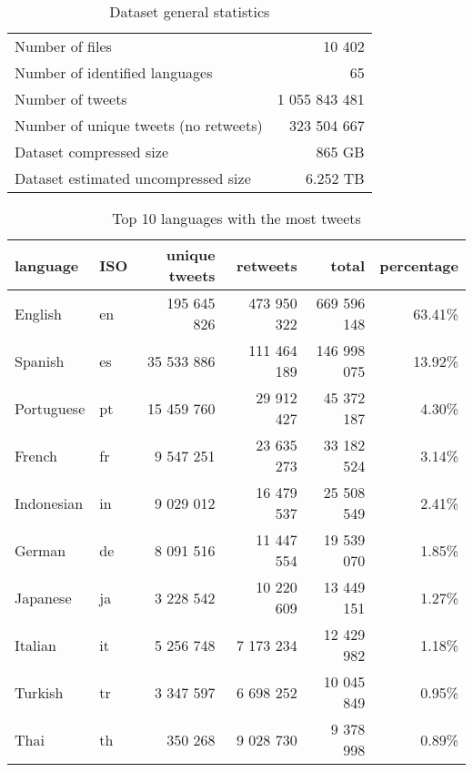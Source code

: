 \begin{table}[H]
    \centering
    \begin{tabularx}{\columnwidth}{@{}Xr@{}}
        Number of files & 10 402
        \\
        Number of identified languages & 65
        \\
        Number of tweets & 1 055 843 481
        \\
        Number of unique tweets (no retweets) & 323 504 667
        \\
        Dataset compressed size & 865 GB
        \\
        Dataset estimated uncompressed size & 6.252 TB
    \end{tabularx}
    \caption{Dataset general statistics}
    \label{tab:dataset-stats}
\end{table}

\begin{table}[H]
    \centering
    \begin{tabularx}{\columnwidth}{@{}XXrrrr@{}}
    		\textbf{language} & \textbf{ISO} & \textbf{unique tweets} & \textbf{retweets} & \textbf{total} & \textbf{percentage} \\
    		\midrule
        English & en & 195 645 826 & 473 950 322 & 669 596 148 & 63.41\% 
        \\
		Spanish & es & 35 533 886 & 111 464 189 & 146 998 075 & 13.92\% 
		\\
		Portuguese & pt & 15 459 760 & 29 912 427 & 45 372 187 & 4.30\% 
		\\
		French & fr & 9 547 251 & 23 635 273 & 33 182 524 & 3.14\% 
		\\
		Indonesian & in & 9 029 012 & 16 479 537 & 25 508 549 & 2.41\%
		\\
		German & de & 8 091 516 & 11 447 554 & 19 539 070 & 1.85\%
		\\
		Japanese & ja & 3 228 542 & 10 220 609 & 13 449 151 & 1.27\%
		\\
		Italian & it & 5 256 748 & 7 173 234 & 12 429 982 & 1.18\%
		\\
		Turkish & tr & 3 347 597 & 6 698 252 & 10 045 849 & 0.95\%
		\\
		Thai & th & 350 268 & 9 028 730 & 9 378 998 & 0.89\%
		\\
		\bottomrule
    \end{tabularx}
    \caption{Top 10 languages with the most tweets}
    \label{tab:dataset-language-stats}
\end{table}

